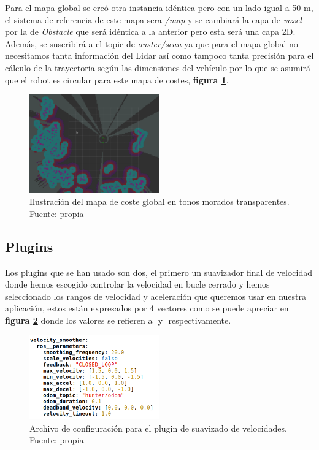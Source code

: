 Para el mapa global se creó otra instancia idéntica pero con un lado igual a 50 m, el sistema de referencia de este mapa sera \textit{/map} y se cambiará 
la capa de \textit{voxel} por la de \textit{Obstacle} que será idéntica a la anterior pero esta será una capa 2D. Además, se 
suscribirá a el topic de \textit{ouster/scan} ya que para el mapa global no necesitamos tanta información del Lidar así como tampoco tanta precisión para el 
cálculo de la trayectoria según las dimensiones del vehículo por lo que se asumirá que el robot es circular para este mapa de costes, \textbf{figura \ref{fig:mapa_global}}.

\begin{figure}[H]
    \centering
    \includegraphics[width=0.5\textwidth]{images/mapa_coste_global.png}
    \caption{Ilustración del mapa de coste global en tonos morados transparentes. Fuente: propia}
    \label{fig:mapa_global}
\end{figure}

\subsection{Plugins}
Los plugins que se han usado son dos, el primero un suavizador final de velocidad donde hemos escogido controlar la velocidad en bucle cerrado y 
hemos seleccionado los rangos de velocidad y aceleración que queremos usar en nuestra aplicación, estos están expresados por 4 vectores como se 
puede apreciar en \textbf{figura \ref{fig:suavizado_vel}} donde los valores se refieren a \begin{math}[\dot{X},\dot{Y},\dot{\theta_{z}}]\end{math} 
 y \begin{math}[\ddot{X}, \ddot{Y}, \ddot{\theta_{z}}] \end{math} respectivamente.

\begin{figure}[H]
    \centering
    \includegraphics[width=0.5\textwidth]{images/velocity_smoother_configuracion.png}
    \caption{Archivo de configuración para el plugin de suavizado de velocidades. Fuente: propia}
    \label{fig:suavizado_vel}
\end{figure}

